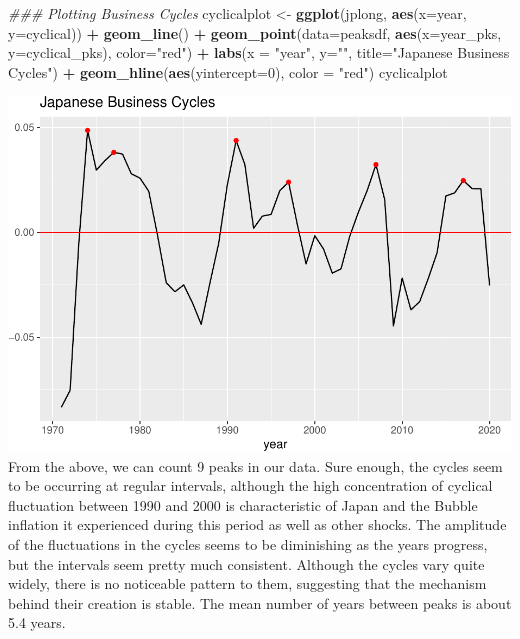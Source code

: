 \documentclass[
]{article}
\newenvironment{Shaded}{\begin{snugshade}}{\end{snugshade}}
\newcommand{\CommentTok}[1]{\textcolor[rgb]{0.56,0.35,0.01}{\textit{#1}}}
\newcommand{\DataTypeTok}[1]{\textcolor[rgb]{0.13,0.29,0.53}{#1}}
\newcommand{\DecValTok}[1]{\textcolor[rgb]{0.00,0.00,0.81}{#1}}
\newcommand{\KeywordTok}[1]{\textcolor[rgb]{0.13,0.29,0.53}{\textbf{#1}}}
\newcommand{\NormalTok}[1]{#1}
\newcommand{\OperatorTok}[1]{\textcolor[rgb]{0.81,0.36,0.00}{\textbf{#1}}}
\newcommand{\StringTok}[1]{\textcolor[rgb]{0.31,0.60,0.02}{#1}}
\begin{document}
\begin{Shaded}
\begin{Highlighting}[]
\CommentTok{### Plotting Business Cycles}
\NormalTok{cyclicalplot <-}\StringTok{ }\KeywordTok{ggplot}\NormalTok{(jplong, }\KeywordTok{aes}\NormalTok{(}\DataTypeTok{x=}\NormalTok{year, }\DataTypeTok{y=}\NormalTok{cyclical)) }\OperatorTok{+}
\StringTok{  }\KeywordTok{geom_line}\NormalTok{() }\OperatorTok{+}\StringTok{ }
\StringTok{  }\KeywordTok{geom_point}\NormalTok{(}\DataTypeTok{data=}\NormalTok{peaksdf, }\KeywordTok{aes}\NormalTok{(}\DataTypeTok{x=}\NormalTok{year_pks, }\DataTypeTok{y=}\NormalTok{cyclical_pks), }\DataTypeTok{color=}\StringTok{"red"}\NormalTok{) }\OperatorTok{+}\StringTok{ }
\StringTok{  }\KeywordTok{labs}\NormalTok{(}\DataTypeTok{x =} \StringTok{"year"}\NormalTok{, }\DataTypeTok{y=}\StringTok{""}\NormalTok{, }\DataTypeTok{title=}\StringTok{"Japanese Business Cycles"}\NormalTok{) }\OperatorTok{+}
\StringTok{  }\KeywordTok{geom_hline}\NormalTok{(}\KeywordTok{aes}\NormalTok{(}\DataTypeTok{yintercept=}\DecValTok{0}\NormalTok{), }\DataTypeTok{color =} \StringTok{"red"}\NormalTok{)}
\NormalTok{cyclicalplot}
\end{Highlighting}
\end{Shaded}

\includegraphics{rbc_report_files/figure-latex/unnamed-chunk-2-1.pdf}
From the above, we can count 9 peaks in our data. Sure enough, the
cycles seem to be occurring at regular intervals, although the high
concentration of cyclical fluctuation between 1990 and 2000 is
characteristic of Japan and the Bubble inflation it experienced during
this period as well as other shocks. The amplitude of the fluctuations
in the cycles seems to be diminishing as the years progress, but the
intervals seem pretty much consistent. Although the cycles vary quite
widely, there is no noticeable pattern to them, suggesting that the
mechanism behind their creation is stable. The mean number of years
between peaks is about 5.4 years.
\end{document}
